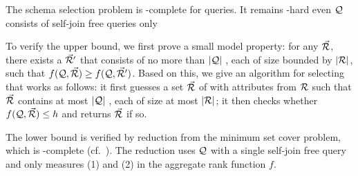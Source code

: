 \begin{theorem}\label{thm-complexity}
  The \baav schema selection problem
  is \NP-complete for \warn{\SQL} %
  queries. 
It remains \NP-hard even $\mathcal Q$ consists of self-join free
\SPC queries only 
\end{theorem}

\vspace{-0.4ex}

\begin{proofS}
To verify the upper bound, we first prove a small model
property: for any \bds $\vec{{\mathcal R}}$, there exists a \bds $\vec{{\mathcal R}}'$
that consists of no more than $|{\mathcal Q}|$ \bss, each of size
bounded by $|{\mathcal R}|$, such that $f(\mathcal Q, \vec{{\mathcal R}}) \geq f(\mathcal Q,
\vec{{\mathcal R}}')$. Based on this, we give an \NP algorithm for selecting
  \bds that works as follows:
it first guesses a set $\vec{{\mathcal R}}$ of \bss with attributes from
${\mathcal R}$ such that $\vec{{\mathcal R}}$ contains at most $|{\mathcal Q}|$ \bss,
each of size at most $|{\mathcal R}|$;
it then checks whether $f(\mathcal Q, \vec{{\mathcal R}})\leq h$ and returns
$\vec{{\mathcal R}}$ if so.

The lower bound is verified by
reduction from the minimum set cover problem, which is
\NP-complete (cf.~\cite{GaJo79}).
The reduction uses $\mathcal Q$ with a single
self-join free \SPC query and only measures (1) and (2) in the
aggregate rank function $f$.
\end{proofS}


